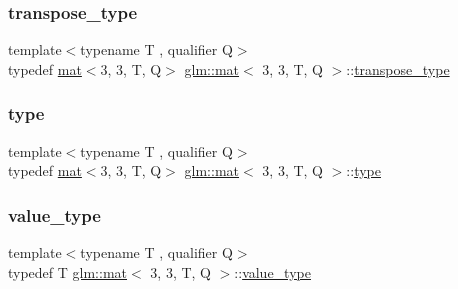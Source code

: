\mbox{\label{structglm_1_1mat_3_013_00_013_00_01_t_00_01_q_01_4_a4ad9d88cb078cca298550c57bad63c21}} 
\subsubsection{\texorpdfstring{transpose\+\_\+type}{transpose\_type}}
{\footnotesize\ttfamily template$<$typename T , qualifier Q$>$ \\
typedef \hyperlink{structglm_1_1mat}{mat}$<$3, 3, T, Q$>$ \hyperlink{structglm_1_1mat}{glm\+::mat}$<$ 3, 3, T, Q $>$\+::\hyperlink{structglm_1_1mat_3_013_00_013_00_01_t_00_01_q_01_4_a4ad9d88cb078cca298550c57bad63c21}{transpose\+\_\+type}}

\mbox{\label{structglm_1_1mat_3_013_00_013_00_01_t_00_01_q_01_4_a2e88f5a6401ca62e81b61443f0148ff0}} 
\subsubsection{\texorpdfstring{type}{type}}
{\footnotesize\ttfamily template$<$typename T , qualifier Q$>$ \\
typedef \hyperlink{structglm_1_1mat}{mat}$<$3, 3, T, Q$>$ \hyperlink{structglm_1_1mat}{glm\+::mat}$<$ 3, 3, T, Q $>$\+::\hyperlink{structglm_1_1mat_3_013_00_013_00_01_t_00_01_q_01_4_a2e88f5a6401ca62e81b61443f0148ff0}{type}}

\mbox{\label{structglm_1_1mat_3_013_00_013_00_01_t_00_01_q_01_4_a1fba85531bcdc9309f4755f30f44dd6f}} 
\subsubsection{\texorpdfstring{value\+\_\+type}{value\_type}}
{\footnotesize\ttfamily template$<$typename T , qualifier Q$>$ \\
typedef T \hyperlink{structglm_1_1mat}{glm\+::mat}$<$ 3, 3, T, Q $>$\+::\hyperlink{structglm_1_1mat_3_013_00_013_00_01_t_00_01_q_01_4_a1fba85531bcdc9309f4755f30f44dd6f}{value\+\_\+type}}




